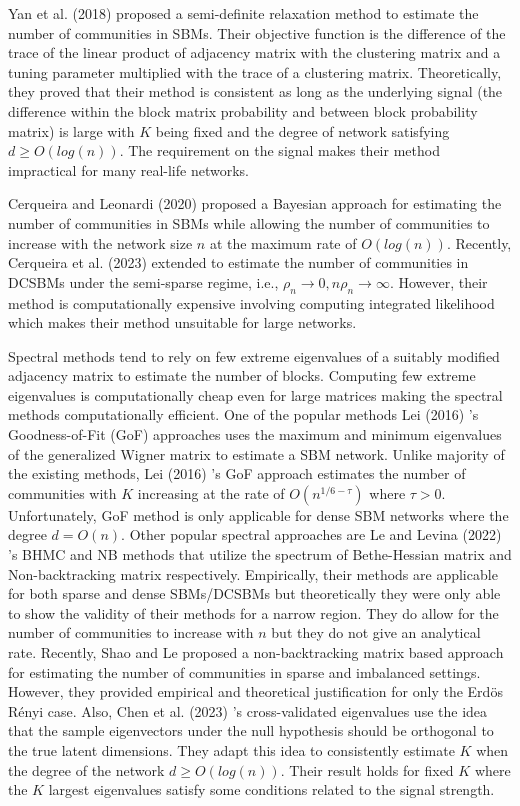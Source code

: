 \documentclass[11pt]{article}
\begin{document}
Yan et al. (2018) \cite{yan2018} proposed a semi-definite relaxation method to estimate the number of communities in SBMs. Their objective function is the difference of the trace of the linear product of adjacency matrix with the clustering matrix and a tuning parameter multiplied with the trace of a clustering matrix. Theoretically, they proved that their method is consistent as long as the underlying signal (the difference within the block matrix probability and between block probability matrix) is large with $K$ being fixed and the degree of network satisfying $d \ge O(log(n))$. The requirement on the signal makes their method impractical for many real-life networks.

Cerqueira and Leonardi (2020) \cite{cerqueira2020} proposed a Bayesian approach for estimating the number of communities in SBMs while allowing the number of communities to increase with the network size $n$ at the maximum rate of $O(log(n))$. Recently, Cerqueira et al. (2023) \cite{cerqueira2023} extended \cite{cerqueira2020} to estimate the number of communities in DCSBMs under the semi-sparse regime, i.e., $\rho_n \to 0, n \rho_n \to \infty$. However, their method is computationally expensive involving computing integrated likelihood which makes their method unsuitable for large networks.
 
Spectral methods tend to rely on few extreme eigenvalues of a suitably modified adjacency matrix to estimate the number of blocks. Computing few extreme eigenvalues is computationally cheap even for large matrices making the spectral methods computationally efficient. One of the popular methods Lei (2016) \cite{lei16}'s Goodness-of-Fit (GoF) approaches uses the maximum and minimum eigenvalues of the generalized Wigner matrix to estimate a SBM network. Unlike majority of the existing methods, Lei (2016) \cite{lei16}'s GoF approach estimates the number of communities with $K$ increasing at the rate of $O(n^{1/6 
 - \tau})$ where $\tau > 0$. Unfortunately, GoF method is only applicable for dense SBM networks where the degree $d = O(n)$.
Other popular spectral approaches are Le and Levina (2022) \cite{le2022}'s BHMC and NB methods that utilize the spectrum of Bethe-Hessian matrix and Non-backtracking matrix respectively. Empirically, their methods are applicable for both sparse and dense SBMs/DCSBMs but theoretically they were only able to show the validity of their methods for a narrow region. They do allow for the number of communities to increase with $n$ but they do not give an analytical rate. Recently, Shao and Le \cite{le2024} proposed a non-backtracking matrix based approach for estimating the number of communities in sparse and imbalanced settings. However, they provided empirical and theoretical justification for only the Erd\"{o}s R\'{e}nyi case.
Also, Chen et al. (2023) \cite{chen2021}'s cross-validated eigenvalues use the idea that the sample eigenvectors under the null hypothesis should be orthogonal to the true latent dimensions. They adapt this idea to consistently estimate $K$ when the degree of the network $d \ge O(log(n))$. Their result holds for fixed $K$ where the $K$ largest eigenvalues satisfy some conditions related to the signal strength.
\end{document}
